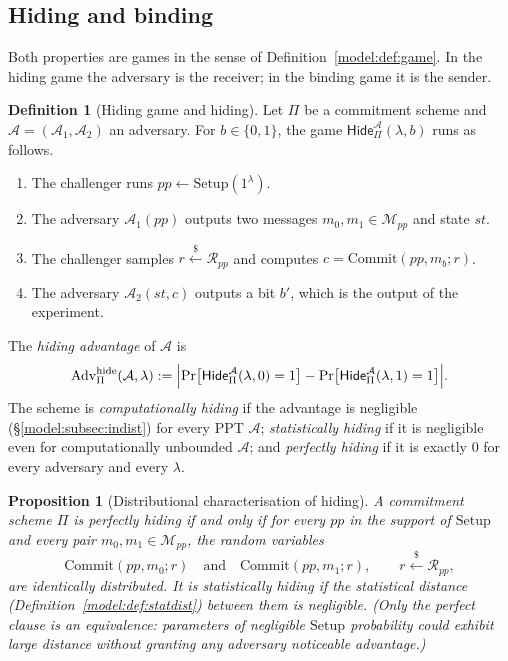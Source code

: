 \documentclass[11pt,a4paper]{article}
\newtheorem{proposition}[theorem]{Proposition}
\theoremstyle{definition}
\newtheorem{definition}[theorem]{Definition}
\theoremstyle{remark}
\begin{document}
\subsection{Hiding and binding}
\label{commitments:subsec:hiding-binding}

Both properties are games in the sense of
Definition~\ref{model:def:game}. In the hiding game the adversary is the
receiver; in the binding game it is the sender.

\begin{definition}[Hiding game and hiding]
\label{commitments:def:hiding}
Let \(\Pi\) be a commitment scheme and
\(\mathcal A = (\mathcal A_1, \mathcal A_2)\) an adversary. For
\(b \in \{0,1\}\), the game
\(\mathsf{Hide}^{\mathcal A}_{\Pi}(\lambda, b)\) runs as follows.
\begin{enumerate}
\item The challenger runs \(pp \gets \mathrm{Setup}(1^\lambda)\).
\item The adversary \(\mathcal A_1(pp)\) outputs two messages
  \(m_0, m_1 \in \mathcal M_{pp}\) and state \(st\).
\item The challenger samples \(r \xleftarrow{\$} \mathcal R_{pp}\)
  and computes \(c = \mathrm{Commit}(pp, m_b; r)\).
\item The adversary \(\mathcal A_2(st, c)\) outputs a bit \(b'\),
  which is the output of the experiment.
\end{enumerate}
The \emph{hiding advantage} of \(\mathcal A\) is
\[
\mathrm{Adv}^{\mathrm{hide}}_{\Pi}(\mathcal A, \lambda)
:= \Bigl|
   \Pr\bigl[\mathsf{Hide}^{\mathcal A}_{\Pi}(\lambda, 0) = 1\bigr]
 - \Pr\bigl[\mathsf{Hide}^{\mathcal A}_{\Pi}(\lambda, 1) = 1\bigr]
   \Bigr| .
\]
The scheme is \emph{computationally hiding} if the advantage is
negligible (\S\ref{model:subsec:indist}) for every PPT
\(\mathcal A\); \emph{statistically hiding} if it is negligible even
for computationally unbounded \(\mathcal A\); and \emph{perfectly
hiding} if it is exactly \(0\) for every adversary and every
\(\lambda\).
\end{definition}

\begin{proposition}[Distributional characterisation of hiding]
\label{commitments:prop:hiding-dist}
A commitment scheme \(\Pi\) is perfectly hiding if and only
if for every \(pp\) in the support of \(\mathrm{Setup}\) and every
pair \(m_0, m_1 \in \mathcal M_{pp}\), the random variables
\[
\mathrm{Commit}(pp, m_0; r)
\quad\text{and}\quad
\mathrm{Commit}(pp, m_1; r),
\qquad r \xleftarrow{\$} \mathcal R_{pp},
\]
are identically distributed. It is statistically hiding if the
statistical distance (Definition~\ref{model:def:statdist}) between
them is negligible. (Only the perfect clause is an equivalence:
parameters of negligible \(\mathrm{Setup}\) probability could
exhibit large distance without granting any adversary noticeable
advantage.)
\end{proposition}
\end{document}
